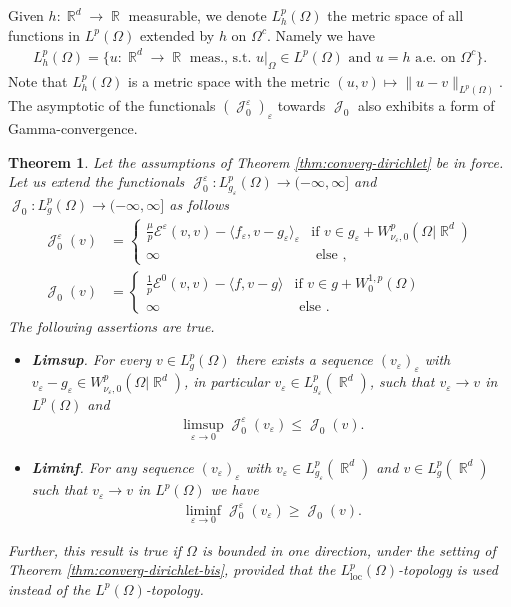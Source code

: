 \documentclass[12pt, reqno]{amsart}%
\theoremstyle{plain}  %
\newtheorem{theorem}{Theorem}[section]
\theoremstyle{definition}  %
\numberwithin{equation}{section}
\DeclareMathOperator{\cJ}{\mathcal{J}}
\DeclareMathOperator{\R}{\mathbb{R}}
\newcommand{\eps}{\varepsilon}
\newcommand{\WnuOmRao}{W^p_{\nu_\eps,0}(\Omega|\R^d)}
\begin{document}
Given  $h:\R^d\to \R$ measurable, we denote $L^p_h(\Omega)$ the metric space of all functions in $L^p(\Omega)$ extended by $h$ on $\Omega^c$. Namely we have
\begin{align*}
L^p_h(\Omega)= \{ u:\R^d\to\R\,\,\text{meas., s.t. $u|_\Omega\in L^p(\Omega)$  and $u=h$ a.e. on $\Omega^c$} \}.
\end{align*}
Note that $L^p_h(\Omega)$ is a metric space with the metric $(u,v)\mapsto \| u-v\|_{L^p(\Omega)}$.  The asymptotic of the functionals $(\cJ^\eps_0)_\eps$ towards $\cJ_0$ also exhibits a form of Gamma-convergence.
\begin{theorem}\label{thm:gamma-conv-Jo}
Let the assumptions of Theorem \ref{thm:converg-dirichlet}  be in force. Let us extend the functionals $\cJ^\eps_0: L^p_{g_\eps}(\Omega)\to (-\infty,\infty]$  and $\cJ_0: L^p_{g}(\Omega)\to (-\infty,\infty]$ as follows
\begin{align*}
\cJ^\eps_0 (v)
&=\begin{cases}
\tfrac{\mu}{p} \mathcal{E}^\eps(v,v)  -\langle f_\eps, v-g_\eps\rangle_\eps  & \text{if $v\in g_\eps+\WnuOmRao$}\\
\infty &\text{ else },
\end{cases}\\
\cJ_0(v) &=\begin{cases}
\tfrac{1}{p}\mathcal{E}^0(v,v)  -\langle f, v-g\rangle
& \text{if $v\in g+W^{1,p}_0(\Omega)$}\\
\infty &\text{ else }.
\end{cases}
\end{align*}
The following assertions are true.

\begin{itemize}
\item \textbf{Limsup}.  For every  $v\in L^p_g(\Omega)$ there exists a sequence $(v_\eps)_\eps$ with  $v_\eps-g_\eps \in \WnuOmRao$, in particular $v_\eps \in L^p_{g_\eps}(\R^d) $, such that  $v_\eps\to v$ in $L^p(\Omega)$  and
\begin{align*}
\limsup_{\eps\to0} \cJ^\eps_0(v_\eps)\leq \cJ_0(v).
\end{align*}
\item \textbf{Liminf}. For any sequence $(v_\eps)_\eps$  with $v_\eps \in L^p_{g_\eps}(\R^d) $ and $v \in L^p_{g}(\R^d) $ such that $v_\eps\to v$ in $L^p(\Omega)$ we have
\begin{align*}
\liminf_{\eps\to0} \cJ^\eps_0(v_\eps)\geq \cJ_0(v).
\end{align*}
\end{itemize}
Further, this result is true if $\Omega$ is bounded in one direction, under the setting of Theorem \ref{thm:converg-dirichlet-bis}, provided that the $L^p_{\mathrm{loc}}(\Omega)$-topology is used instead of  the $L^p(\Omega)$-topology.
\end{theorem}
\end{document}
